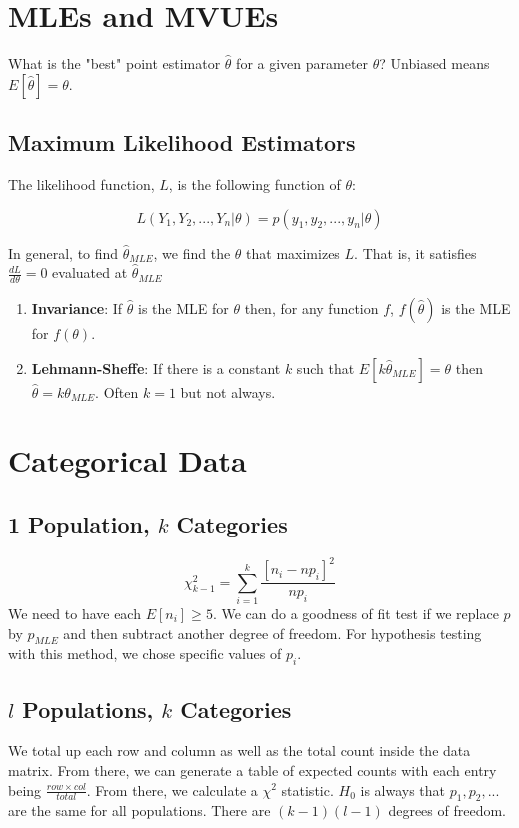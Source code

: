 \documentclass{article}
\begin{document}
\section{MLEs and MVUEs}
What is the "best" point estimator $\hat{\theta}$ for a given parameter
$\theta$? Unbiased means $E[\hat{\theta}] = \theta$.

\subsection{Maximum Likelihood Estimators}
The likelihood function, $L$, is the following function of $\theta$:

\[ L(Y_1,Y_2,...,Y_n|\theta) = p(y_1,y_2,...,y_n|\theta) \]

In general, to find $\hat{\theta}_{MLE}$, we find the $\theta$ that maximizes
$L$. That is, it satisfies $\frac{dL}{d\theta} = 0$ evaluated at
$\hat{\theta}_{MLE}$

\begin{enumerate}
  \item {\bf Invariance}: If $\hat{\theta}$ is the MLE for $\theta$ then, for
    any function $f$, $f(\hat{\theta})$ is the MLE for $f(\theta)$.
  \item {\bf Lehmann-Sheffe}: If there is a constant $k$ such that
    $E[k\hat{\theta}_{MLE}]=\theta$ then $\hat{\theta} = k\theta_{MLE}$. Often
    $k=1$ but not always.
\end{enumerate}

\section{Categorical Data}
\subsection{1 Population, $k$ Categories}
\begin{equation}
  \chi^2_{k-1} = \sum_{i=1}^{k}\frac{[n_i - np_i]^2}{np_i}
\end{equation}
We need to have each $E[n_i] \geq 5$. We can do a goodness of fit test if we
replace $p$ by $p_{MLE}$ and then subtract another degree of freedom. For
hypothesis testing with this method, we chose specific values of $p_i$.

\subsection{$l$ Populations, $k$ Categories}
We total up each row and column as well as the total count inside the data
matrix. From there, we can generate a table of expected counts with each entry
being $\frac{row \times col}{total}$. From there, we calculate a $\chi^2$
statistic. $H_0$ is always that $p_1, p_2, ...$ are the same for all
populations. There are $(k-1)(l-1)$ degrees of freedom.
\end{document}
